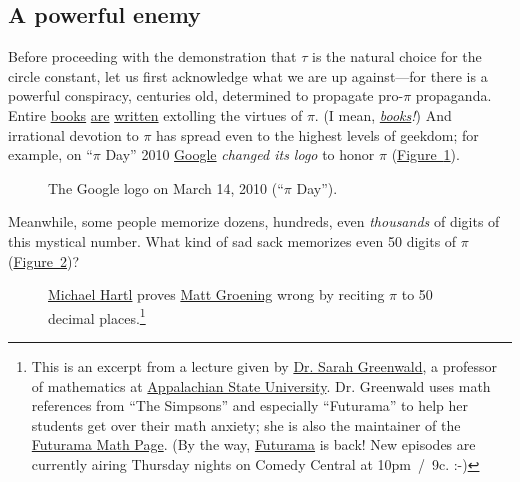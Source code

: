 \documentclass{article}
\begin{document}
 \subsection{A powerful enemy} %

Before proceeding with the demonstration that $\tau$ is the natural choice for the circle constant, let us first acknowledge what we are up against---for there is a powerful conspiracy, centuries old, determined to propagate pro-$\pi$ propaganda. Entire \href{http://www.amazon.com/exec/obidos/ISBN=0802713327/parallaxproductiA/}{books} \href{http://www.amazon.com/Pi-Sky-Counting-Thinking-Being/dp/0198539568}{are} \href{http://www.amazon.com/exec/obidos/ISBN=0312381859/parallaxproductiA/}{written} extolling the virtues of $\pi$. (I mean, \href{http://www.amazon.com/exec/obidos/ISBN=0387989463/parallaxproductiA/}{\emph{books}}\emph{!}) And irrational devotion to $\pi$ has spread even to the highest levels of geekdom; for example, on ``$\pi$ Day'' 2010 \href{http://www.google.com/}{Google} \emph{changed its logo} to honor $\pi$  (\hyperref[fig:google-pi-day]{Figure~}\ref{fig:google-pi-day}).  

\begin{figure}
\begin{center}
\end{center}
\caption{The Google logo on March 14, 2010 (``$\pi$ Day'').\label{fig:google-pi-day}}
\end{figure}

Meanwhile, some people memorize dozens, hundreds, even \emph{thousands} of digits of this mystical number. What kind of sad sack memorizes even 50 digits of $\pi$ (\hyperref[fig:futurama_video]{Figure~}\ref{fig:futurama_video})? 

\begin{figure}
\begin{center}
\end{center}
\caption{\href{#sec:about_the_author}{Michael Hartl} proves \href{http://en.wikipedia.org/wiki/Matt_Groening}{Matt Groening} wrong by reciting $\pi$ to 50 decimal places.\footnote{This is an excerpt from a lecture given by \href{http://mathsci.appstate.edu/~sjg/}{Dr. Sarah Greenwald}, a professor of mathematics at \href{http://www.appstate.edu/}{Appalachian State University}. Dr. Greenwald uses math references from ``The Simpsons'' and especially ``Futurama'' to help her students get over their math anxiety; she is also the maintainer of the \href{http://www.mathsci.appstate.edu/~sjg/futurama/}{Futurama Math Page}. (By the way, \href{http://www.comedycentral.com/shows/futurama/index.jhtml}{Futurama} is back! New episodes are currently airing Thursday nights on Comedy Central at 10pm~/~9c. :-)}\label{fig:futurama_video}}
\end{figure}
\end{document}
